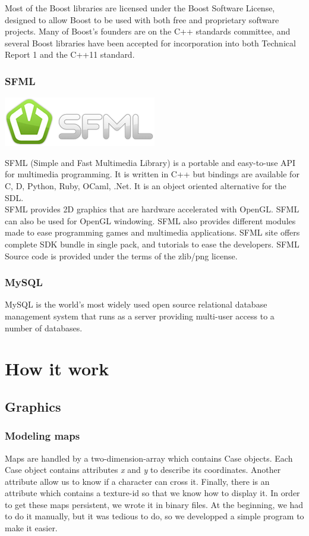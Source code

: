 \documentclass{scrreprt}
\begin{document}
Most of the Boost libraries are licensed under the Boost Software License, designed to allow Boost to be used with both free and proprietary software projects. Many of Boost's founders are on the C++ standards committee, and several Boost libraries have been accepted for incorporation into both Technical Report 1 and the C++11 standard.

\subsection{SFML} %
\label{SFML}

\begin{center}
\includegraphics[scale=0.75]{SFML2.png}
\end{center}

SFML (Simple and Fast Multimedia Library) is a portable and easy-to-use API for multimedia programming. It is written in C++ but bindings are available for C, D, Python, Ruby, OCaml, .Net. It is an object oriented alternative for the SDL.\\

SFML provides 2D graphics that are hardware accelerated with OpenGL. SFML can also be used for OpenGL windowing. SFML also provides different modules made to ease programming games and multimedia applications. SFML site offers complete SDK bundle in single pack, and tutorials to ease the developers. SFML Source code is provided under the terms of the zlib/png license.

\subsection{MySQL}
MySQL is the world's most widely used open source relational database management system that runs as a server providing multi-user access to a number of databases.

\chapter{How it work}
\section{Graphics}
\subsection{Modeling maps}
Maps are handled by a two-dimension-array which contains Case objects. Each Case object contains attributes \emph{x} and \emph{y} to describe its coordinates. Another attribute allow us to know if a character can cross it. Finally, there is an attribute which contains a texture-id so that we know how to display it. In order to get these maps persistent, we wrote it in binary files. At the beginning, we had to do it manually, but it was tedious to do, so we developped a simple program to make it easier.\\
\end{document}
